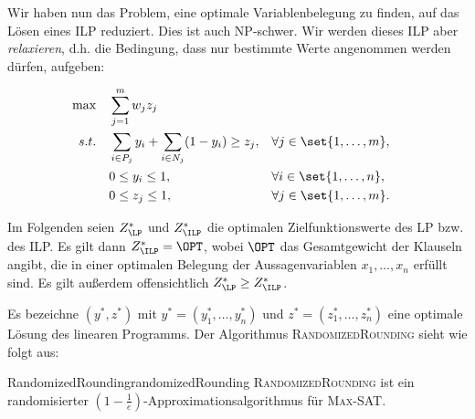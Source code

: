 \documentclass[language=ngerman,algolist]{TemplateLecture}
\begin{document}
Wir haben nun das Problem, eine optimale Variablenbelegung zu finden, auf das Lösen eines ILP reduziert. Dies ist auch NP-schwer. Wir werden dieses ILP aber \emph{relaxieren}, d.h. die Bedingung, dass nur bestimmte Werte angenommen werden dürfen, aufgeben:

\begin{align*}
    \max \quad & \sum_{j = 1}^m w_j z_j \\ 
    s.t. \quad & \sum_{i \in P_j} y_i + \sum_{i \in N_j} (1-y_i) \geq z_j, & & \forall j \in \set{1,\ldots,m}, \\
    & 0 \leq y_i \leq 1, & & \forall i \in \set{1,\ldots,n}, \\
    & 0 \leq z_j \leq 1, & & \forall j \in \set{1,\ldots,m}.
\end{align*}

Im Folgenden seien $Z^*_{\LP}$ und $Z^*_{\ILP}$ die optimalen Zielfunktionswerte des LP bzw. des ILP. Es gilt dann $Z^*_{\ILP} = \OPT$, wobei $\OPT$ das Gesamtgewicht der Klauseln angibt, die in einer optimalen Belegung der Aussagenvariablen $x_1, \ldots, x_n$ erfüllt sind. Es gilt außerdem offensichtlich $Z^*_{\LP} \geq Z^*_{\ILP}$.

Es bezeichne $(y^*, z^*)$ mit $y^* = (y^*_1, \ldots, y^*_n)$ und $z^* = (z^*_1, \ldots, z^*_n)$ eine optimale Lösung des linearen Programms. Der Algorithmus \textsc{RandomizedRounding} sieht wie folgt aus:

\begin{algorithm}[h]
    \caption{\textsc{RandomizedRounding}}\label{alg:RandomizedRounding}
    \begin{algorithmic}[1]
    \end{algorithmic}
\end{algorithm}

\begin{thm}{RandomizedRounding}{randomizedRounding}
    \textsc{RandomizedRounding} ist ein randomisierter $\left(1-\frac{1}{e}\right)$-Approximationsalgorithmus für \textsc{Max-SAT}.
\end{thm}
\end{document}
